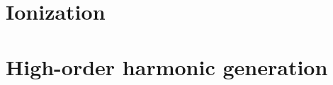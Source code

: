 \documentclass[pdftex,11pt,twoside,
%
%
a4paper]{report}
\numberwithin{equation}{chapter}       %
\theoremstyle{named}
\begin{document}
\setcounter{page}{1}    %

\newpage 

\newpage













\singlespacing



\newpage
\singlespacing
{}
\tableofcontents  

\newpage
{}
\listoffigures

\listofmathaside



\singlespacing
%





\onehalfspacing

\makeatletter
\@openrighttrue
\makeatother








%


\part{Ionization}
\label{part:I}








\part{High-order harmonic generation}
\label{part:II}




\end{document}
